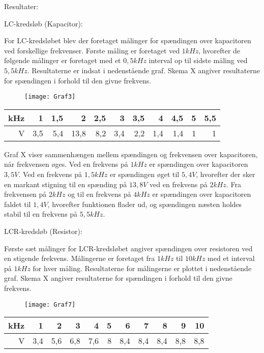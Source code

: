 Resultater:

LC-kredsløb (Kapacitor):

For LC-kredsløbet blev der foretaget målinger for spændingen over kapacitoren ved forskellige frekvenser. Første måling er foretaget ved $1 kHz$, hvorefter de følgende målinger er foretaget med et $0,5 kHz$ interval op til sidste måling ved $5,5 kHz$. Resultaterne er indsat i nedenstående graf. Skema X angiver resultaterne for spændingen i forhold til den givne frekvens.

\begin{figure}[H]
\texttt{[image: Graf3]}
\end{figure}

\begin{tabular}{|r|r|r|r|r|r|r|r|r|r|r|} \hline
kHz & 1 & 1,5 & 2 & 2,5 & 3 & 3,5 & 4 & 4,5 & 5 & 5,5 \\ \hline
V & 3,5 & 5,4 & 13,8 & 8,2 & 3,4 & 2,2 & 1,4 & 1,4 & 1 & 1 \\ \hline
\end{tabular}

Graf X viser sammenhængen mellem spændingen og frekvensen over kapacitoren, når frekvensen øges. Ved en frekvens på $1 kHz$ er spændingen over kapacitoren $3,5 V$. Ved en frekvens på $1,5 kHz$ er spændingen øget til $5,4 V$, hvorefter der sker en markant stigning til en spænding på $13,8 V$ ved en frekvens på $2 kHz$. Fra frekvensen på $2 kHz$ og til en frekvens på $4 kHz$ er spændingen over kapacitoren faldet til $1,4 V$, hvorefter funktionen flader ud, og spændingen næsten holdes stabil til en frekvens på $5,5 kHz$.

LCR-kredsløb (Resistor):

Første sæt målinger for LCR-kredsløbet angiver spændingen over resistoren ved en stigende frekvens. Målingerne er foretaget fra $1 kHz$ til $10 kHz$ med et interval på $1 kHz$ for hver måling. Resultaterne for målingerne er plottet i nedenstående graf. Skema X angiver resultaterne for spændingen i forhold til den givne frekvens.

\begin{figure}[H]
\texttt{[image: Graf7]}
\end{figure}

\begin{tabular}{|r|r|r|r|r|r|r|r|r|r|r|} \hline
kHz & 1 & 2 & 3 & 4 & 5 & 6 & 7 & 8 & 9 & 10 \\ \hline
V & 3,4 & 5,6 & 6,8 & 7,6 & 8 & 8,4 & 8,4 & 8,4 & 8,8 & 8,8 \\ \hline
\end{tabular}

